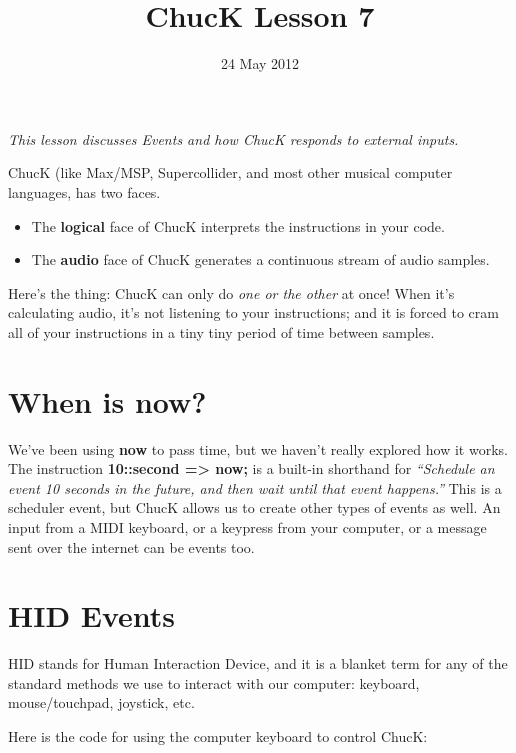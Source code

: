 \documentclass{article}
\title{ChucK Lesson 7}
\date{24 May 2012}
\begin{document}
\maketitle

\textsl{This lesson discusses Events and how ChucK responds to external inputs.}\vspace{2mm}

ChucK (like Max/MSP, Supercollider, and most other musical computer languages, has two faces.

\begin {itemize}

\item The \textbf{logical} face of ChucK interprets the instructions in your code.

\item The \textbf{audio} face of ChucK generates a continuous stream of audio samples.

\end {itemize}

Here's the thing: ChucK can only do \textsl{one or the other} at once! When it's calculating audio, it's not listening to your instructions; and it is forced to cram all of your instructions in a tiny tiny period of time between
samples.

\section{When is now?}

We've been using \textbf{now} to pass time, but we haven't really explored how it works. The instruction \textbf{10::second => now;} is a built-in shorthand for \textsl{``Schedule an event 10 seconds in the future, and then wait until that event happens.''} This is a scheduler event, but ChucK allows us to create other types of events as well. An input from a MIDI keyboard, or a keypress from your computer, or a message sent over the internet can be events too.

\section{HID Events}

HID stands for Human Interaction Device, and it is a blanket term for any of the standard methods we use to interact with our computer: keyboard, mouse/touchpad, joystick, etc.

Here is the code for using the computer keyboard to control ChucK:
\end{document}
